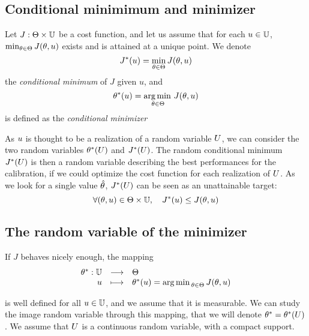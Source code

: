 \documentclass[../../Main_ManuscritThese.tex]{subfiles}
\begin{document}
\subsection{Conditional minimimum and minimizer}
\label{sec:MPE}
\begin{definition}
  Let $J: \Theta \times \mathbb{U}$ be a cost function, and let us assume that for each $u \in \mathbb{U}$, $\min_{\theta \in \Theta} J(\theta,u)$ exists and is attained at a unique point.
  We denote
  \begin{equation}
    J^*(u) = \min_{\theta \in \Theta} J(\theta,u)
  \end{equation}
  the \emph{conditional minimum} of $J$ given $u$, and
  \begin{equation}
    \theta^*(u) = \operatorname*{arg\,min \,}_{\theta\in\Theta} J(\theta, u)
  \end{equation}
 is defined as the \emph{conditional minimizer}
\end{definition}
As $u$ is thought to be a realization of a random variable $U$, we can consider the two random variables $\theta^*(U)$ and $J^*(U)$.
The random conditional minimum $J^*(U)$ is then a random variable describing the best performances for the calibration, if we could optimize the cost function for each realization of $U$. As we look for a single value $\hat{\theta}$, $J^*(U)$ can be seen as an unattainable target:
\begin{equation}
  \forall (\theta,u) \in \Theta \times \mathbb{U}, \quad J^*(u) \leq J(\theta, u)
\end{equation}


\subsection{The random variable of the minimizer}
\label{sec:kstar_rv}

If $J$ behaves nicely enough, the mapping
\begin{equation}
  \begin{array}{rcl}
    \theta^*: \mathbb{U} &\longrightarrow& \Theta \\
    u &\longmapsto& \theta^*(u) = \operatorname*{arg\,min \,}_{\theta \in \Theta} J(\theta, u)
  \end{array}
\end{equation}

is well defined for all $u \in \mathbb{U}$, and we assume that it is measurable. We can study the image random variable through this mapping, that we will denote $\theta^* = \theta^*(U)$.
We assume that $U$ is a continuous random variable, with a compact support.
\end{document}
